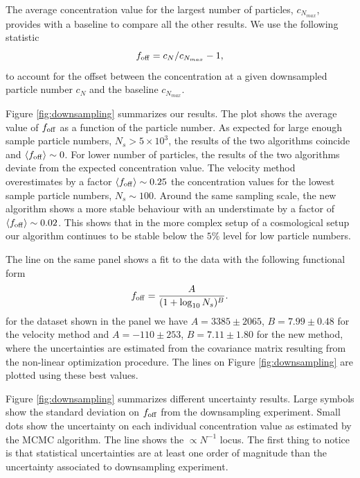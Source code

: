 \documentclass[a4,useAMS,usenatbib,usegraphicx]{mn2e}
\begin{document}
The average concentration value for the largest number of particles, $c_{N_{max}}$,
provides with a baseline to compare all the other results.
We use the following statistic
\begin{equation}
f_{\rm off} = c_{N} / c_{N_{max}} - 1,
\end{equation}
to account for the offset between the concentration at a given
downsampled particle number $c_{N}$ and the baseline $c_{N_{max}}$.

Figure \ref{fig:downsampling} summarizes our results. 
The plot shows the average value of $f_{\rm off}$ as a function
of the particle number.
As expected for large enough sample particle numbers, $N_{s}>5\times
10^3$, the results of the two algorithms coincide and $\langle f_{\rm
  off}\rangle\sim 0$.  
For lower number of particles, the results of the two algorithms
deviate from the expected concentration value.  
The velocity method overestimates by a factor $\langle f_{\rm 
  off}\rangle\sim 0.25$ the concentration values for the lowest
sample particle numbers, $N_{s}\sim 100$. 
Around the same sampling scale, the new algorithm shows a more stable
behaviour with an understimate by a factor of $\langle f_{\rm 
  off}\rangle \sim 0.02$.  
This shows that in the more complex setup of a cosmological setup our
algorithm continues to be stable below the $5\%$ level for low 
particle numbers.  

The line on the same panel shows a fit to the data with the following
functional form 
\begin{equation}
f_{\rm off} = \frac{A}{(1+\log_{10}N_s)^{B}}.
\end{equation} 
for the dataset shown in the panel we have $A=3385\pm 2065$, $B=7.99\pm0.48
$ for the velocity method and $A=-110\pm 253$, $B=7.11\pm1.80$ for the
new method, where the uncertainties are estimated from the covariance 
matrix resulting from the non-linear optimization procedure. The lines
on Figure \ref{fig:downsampling} are plotted using these best values. 


Figure \ref{fig:downsampling} summarizes different uncertainty
results. 
Large symbols show the standard deviation on $f_{\rm off}$
from the downsampling experiment.
Small dots show the uncertainty on each individual concentration value
as estimated by the MCMC algorithm.
The line shows the $\propto N^{-1}$  locus.
The first thing to notice is that statistical uncertainties are at
least one order of magnitude than the uncertainty associated to
downsampling experiment.   
\end{document}

